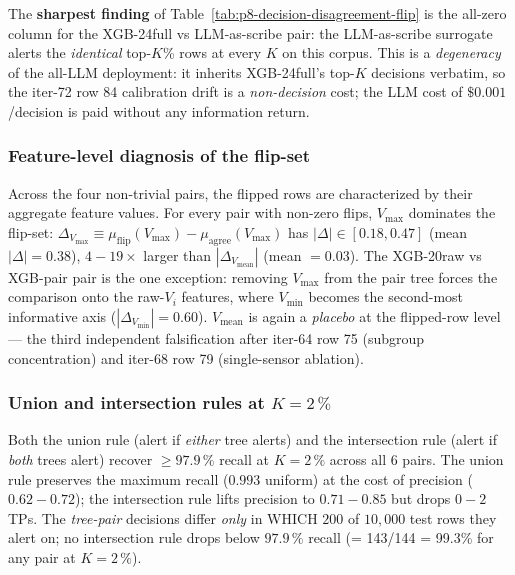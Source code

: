 \documentclass{article}
\providecommand{\tableref}[1]{Table~\ref{#1}}
\begin{document}
The \textbf{sharpest finding} of \tableref{tab:p8-decision-disagreement-flip}
is the all-zero column for the XGB-24full vs LLM-as-scribe pair:
the LLM-as-scribe surrogate alerts the \emph{identical} top-$K$\%
rows at every $K$ on this corpus. This is a \emph{degeneracy} of
the all-LLM deployment: it inherits XGB-24full's top-$K$ decisions
verbatim, so the iter-72 row 84 calibration drift is a
\emph{non-decision} cost; the LLM cost of $\$0.001$/decision is paid
without any information return.

\subsubsection{Feature-level diagnosis of the flip-set}\label{sec:p8-decision-disagreement-features}

Across the four non-trivial pairs, the flipped rows are characterized
by their aggregate feature values. For every pair with non-zero
flips, $V_\text{max}$ dominates the flip-set: $\Delta_{V_\text{max}}
\equiv \mu_\text{flip}(V_\text{max}) - \mu_\text{agree}(V_\text{max})$
has $|\Delta| \in [0.18, 0.47]$ (mean $|\Delta| = 0.38$), $4{-}19\times$
larger than $|\Delta_{V_\text{mean}}|$ (mean $= 0.03$). The
XGB-20raw vs XGB-pair pair is the one exception: removing
$V_\text{max}$ from the pair tree forces the comparison onto the
raw-$V_i$ features, where $V_\text{min}$ becomes the second-most
informative axis ($|\Delta_{V_\text{min}}| = 0.60$). $V_\text{mean}$
is again a \emph{placebo} at the flipped-row level --- the third
independent falsification after iter-64 row 75 (subgroup
concentration) and iter-68 row 79 (single-sensor ablation).

\subsubsection{Union and intersection rules at $K{=}2\,\%$}\label{sec:p8-decision-disagreement-rules}

Both the union rule (alert if \emph{either} tree alerts) and the
intersection rule (alert if \emph{both} trees alert) recover
$\geq 97.9\,\%$ recall at $K{=}2\,\%$ across all 6 pairs. The
union rule preserves the maximum recall ($0.993$ uniform) at the
cost of precision ($0.62{-}0.72$); the intersection rule lifts
precision to $0.71{-}0.85$ but drops $0{-}2$ TPs. The
\emph{tree-pair} decisions differ \emph{only} in WHICH $200$ of
$10{,}000$ test rows they alert on; no intersection rule drops below
$97.9\,\%$ recall (= 143/144 = 99.3\% for any pair at $K{=}2\,\%$).
\end{document}
